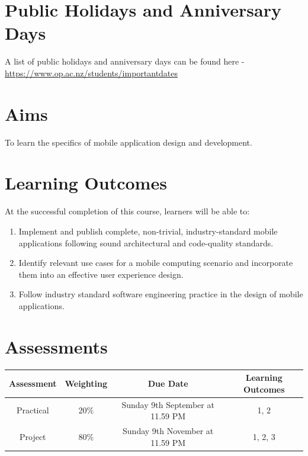 \documentclass{article}
\begin{document}
\section*{Public Holidays and Anniversary Days}
A list of public holidays and anniversary days can be found here - \href{https://www.op.ac.nz/students/importantdates}{https://www.op.ac.nz/students/importantdates}

\section*{Aims}
To learn the specifics of mobile application design and development.

\section*{Learning Outcomes}
At the successful completion of this course, learners will be able to:
\begin{enumerate}
	\item Implement and publish complete, non-trivial, industry-standard mobile applications following sound architectural and code-quality standards.
	\item Identify relevant use cases for a mobile computing scenario and incorporate them into an effective user experience design.
	\item Follow industry standard software engineering practice in the design of mobile applications.
\end{enumerate}  

\section*{Assessments} 
\renewcommand{\arraystretch}{1.5}
\begin{tabular}{|c|c|c|c|}
	\hline 
	\textbf{Assessment}                                 & \textbf{Weighting} & \textbf{Due Date}            & \textbf{Learning Outcomes} \\ \hline
	\small Practical & \small 20\%        & \small Sunday 9th September at 11.59 PM   & \small 1, 2                   \\ \hline
	\small Project                 & \small 80\%        & \small Sunday 9th November at 11.59 PM \small  & \small 1, 2, 3                   \\ \hline
\end{tabular}
\end{document}
